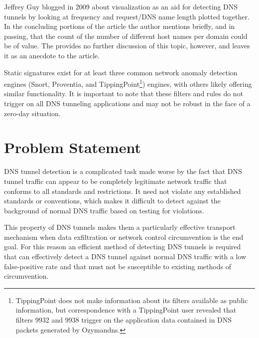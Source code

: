 \documentclass[12pt]{article}
\theoremstyle{remark}
\theoremstyle{definition}
\theoremstyle{definition}
\theoremstyle{definition}
\begin{document}
Jeffrey Guy blogged in 2009 about visualization as an aid for detecting DNS tunnels by looking at frequency and request/DNS name length plotted together. In the concluding portions of the article the author mentions briefly, and in passing, that the count of the number of different host names per domain could be of value. The provides no further discussion of this topic, however, and leaves it as an anecdote to the article.

Static signatures exist for at least three common network anomaly detection engines (Snort\cite{Chamberland2009.snort_iodine}, Proventia\cite{Proventia2013.ips_tunnel}, and TippingPoint\footnote{TippingPoint does not make information about its filters available as public information, but correspondence with a TippingPoint user revealed that filters 9932 and 9938 trigger on the application data contained in DNS packets generated by Ozymandns.}) engines, with others likely offering similar functionality. It is important to note that these filters and rules do not trigger on all DNS tunneling applications and may not be robust in the face of a zero-day situation.

\newpage
\section{Problem Statement}

DNS tunnel detection is a complicated task made worse by the fact that DNS
tunnel traffic can appear to be completely legitimate network traffic that conforms to all standards and restrictions. It
need not violate any established standards or conventions, which makes it
difficult to detect against the background of normal DNS traffic based on testing for violations.

This property of DNS tunnels makes them a particularly effective transport mechanism
when data exfiltration or network control circumvention is the end goal. For
this reason an efficient method of detecting DNS tunnels is required that can
effectively detect a DNS tunnel against normal DNS traffic with a low
false-positive rate and that must not be susceptible to existing methods of
circumvention.
\end{document}
